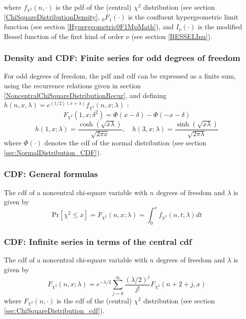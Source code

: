 where $f_{\chi^2}(n, \cdot)$ is the pdf of the (central) $\chi^2$ distribution (see section \ref{ChiSquareDistributionDensity}, ${}_0F_1(\cdot)$ is the  confluent hypergeometric limit function (see section \ref{Hypergeometric0F1MpMath}), and $I_{\nu}(\cdot)$ is the modified Bessel function of the first kind of order $\nu$ (see section  \ref{BESSELInu}).


\subsubsection{Density and CDF: Finite series for odd degrees of freedom}
For odd degrees of freedom, the pdf and cdf can be expressed as a finite sum, using the recurrence relations given in section \ref{NoncentralChiSquareDistributionRecur}, and defining $h(n,x,\lambda) = e^{(1/2)(x+\lambda)} f_{\chi^2}\left(n, x; \lambda\right)$ \citep{Andras_2008}:
\begin{equation}
	F_{\chi^2}\left(1, x;\delta^2 \right) = \Phi(x-\delta)-\Phi(-x-\delta)
\end{equation}
\begin{equation}
	h(1, x;\lambda)   = \frac{\cosh (\sqrt{x\lambda})}{\sqrt{2\pi x}}, \quad h(3, x;\lambda)   = \frac{\sinh (\sqrt{x\lambda})}{\sqrt{2\pi \lambda}}
\end{equation}
where  $\Phi(\cdot)$ denotes the cdf of the normal distribution (see section \ref{sec:NormalDistribution_CDF}).


\subsubsection{CDF: General formulas}
\label{NoncentralChiSquareDistributionCDFEx}

The cdf of a noncentral chi-square variable with $n$ degrees of freedom and $\lambda$ is given by
\begin{equation}
	\text{Pr}\left[\chi^2 \le x\right] = F_{\chi^2}\left(n, x; \lambda\right) =  \int_{0}^{x} f_{\chi^2}\left(n, t; \lambda\right) dt
\end{equation} 

\subsubsection{CDF: Infinite series in terms of the central cdf}
The cdf of a noncentral chi-square variable with $n$ degrees of freedom and $\lambda$ is given by
\begin{equation}
	F_{\chi^2}\left(n, x; \lambda\right) = e^{-\lambda/2} \sum_{j=0}^\infty {\frac{(\lambda /2)^j}{j!} F_{\chi^2}\left(n+2+j, x\right) }
\end{equation} 
where $F_{\chi^2}(n, \cdot)$ is the cdf of the (central) $\chi^2$ distribution (see section \ref{sec:ChiSquareDistribution_cdf}).

